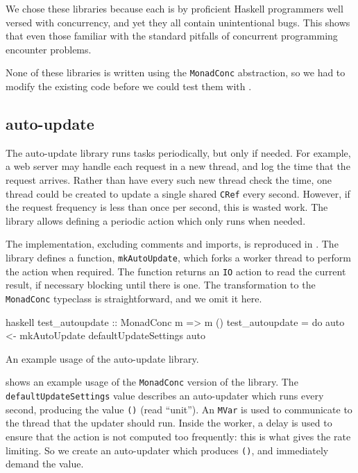 We chose these libraries because each is by proficient Haskell
programmers well versed with concurrency, and yet they all contain
unintentional bugs.  This shows that even those familiar with the
standard pitfalls of concurrent programming encounter problems.

None of these libraries is written using the \verb|MonadConc|
abstraction, so we had to modify the existing code before we could
test them with \dejafu{}.

\subsection{auto-update}

The auto-update library\cite{auto_update} runs tasks periodically, but
only if needed.  For example, a web server may handle each request in
a new thread, and log the time that the request arrives.  Rather than
have every such new thread check the time, one thread could be created
to update a single shared \verb|CRef| every second.  However, if the
request frequency is less than once per second, this is wasted work.
The library allows defining a periodic action which only runs when
needed.

The implementation, excluding comments and imports, is reproduced in
.  The library defines a function,
\verb|mkAutoUpdate|, which forks a worker thread to perform the action
when required.  The function returns an \verb|IO| action to read the
current result, if necessary blocking until there is one.  The
transformation to the \verb|MonadConc| typeclass is straightforward,
and we omit it here.

\begin{listing}
\centering
\begin{cminted}{haskell}
test_autoupdate :: MonadConc m => m ()
test_autoupdate = do
  auto <- mkAutoUpdate defaultUpdateSettings
  auto
\end{cminted}
\caption{An example usage of the auto-update library.}\label{lst:autoupdate_example1}
\end{listing}

 shows an example usage of the
\verb|MonadConc| version of the library.  The
\verb|defaultUpdateSettings| value describes an auto-updater which
runs every second, producing the value \verb|()| (read ``unit'').  An
\verb|MVar| is used to communicate to the thread that the updater
should run.  Inside the worker, a delay is used to ensure that the
action is not computed too frequently: this is what gives the rate
limiting.  So we create an auto-updater which produces \verb|()|, and
immediately demand the value.

